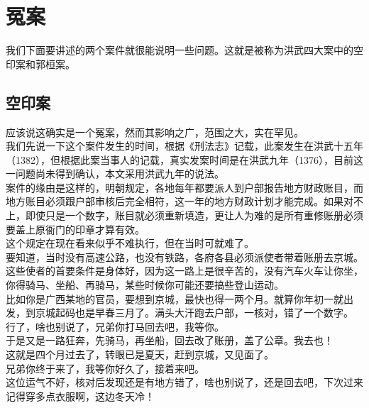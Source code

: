 \section{冤案}
\ifnum{}
	\begin{multicols}{\theparacolNo}
\fi
我们下面要讲述的两个案件就很能说明一些问题。这就是被称为洪武四大案中的空印案和郭桓案。\\

\subsection{空印案}
应该说这确实是一个冤案，然而其影响之广，范围之大，实在罕见。\\

我们先说一下这个案件发生的时间，根据《刑法志》记载，此案发生在洪武十五年（1382），但根据此案当事人的记载，真实发案时间是在洪武九年（1376），目前这一问题尚未得到确认，本文采用洪武九年的说法。\\

案件的缘由是这样的，明朝规定，各地每年都要派人到户部报告地方财政账目，而地方账目必须跟户部审核后完全相符，这一年的地方财政计划才能完成。如果对不上，即使只是一个数字，账目就必须重新填造，更让人为难的是所有重修账册必须要盖上原衙门的印章才算有效。\\

这个规定在现在看来似乎不难执行，但在当时可就难了。\\

要知道，当时没有高速公路，也没有铁路，各府各县必须派使者带着账册去京城。这些使者的首要条件是身体好，因为这一路上是很辛苦的，没有汽车火车让你坐，你得骑马、坐船、再骑马，某些时候你可能还要搞些登山运动。\\

比如你是广西某地的官员，要想到京城，最快也得一两个月。就算你年初一就出发，到京城起码也是早春三月了。满头大汗跑去户部，一核对，错了一个数字。\\

行了，啥也别说了，兄弟你打马回去吧，我等你。\\

于是又是一路狂奔，先骑马，再坐船，回去改了账册，盖了公章。我去也！\\

这就是四个月过去了，转眼已是夏天，赶到京城，又见面了。\\

兄弟你终于来了，我等你好久了，接着来吧。\\

这位运气不好，核对后发现还是有地方错了，啥也别说了，还是回去吧，下次过来记得穿多点衣服啊，这边冬天冷！\\


\end{multicols}
